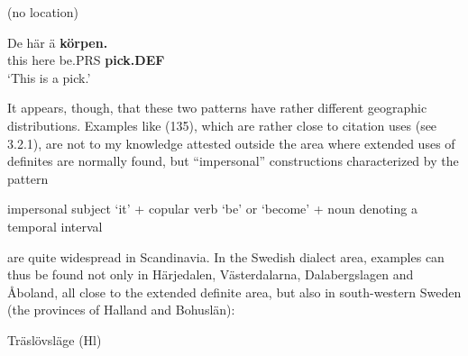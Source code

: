 
\item 

\label{bkm:Ref224115132}(no location)



 \ea\label{}
\gll De  här  ä  \textbf{körpen.}\\


this  here  be.PRS  \textbf{pick.DEF}\\

\glt ‘This is a pick.’

\z

It appears, though, that these two patterns have rather different geographic distributions. Examples like (135), which are rather close to citation uses (see 3.2.1), are not to my knowledge attested outside the area where extended uses of definites are normally found, but “impersonal” constructions characterized by the pattern


impersonal subject ‘it’ + copular verb ‘be’ or ‘become’ + noun denoting a temporal interval


are quite widespread in Scandinavia. In the Swedish dialect area, examples can thus be found not only in Härjedalen, Västerdalarna, Dalabergslagen and Åboland, all close to the extended definite area, but also in south-western Sweden (the provinces of Halland and Bohuslän): 


\item 

Träslövsläge (Hl)


